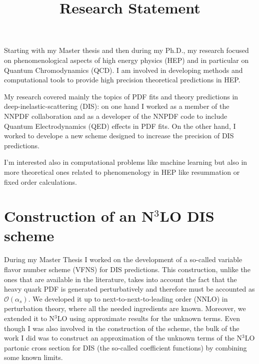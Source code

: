 \documentclass[11pt,a4paper]{moderncv}        %
\title{Research Statement}
\begin{document}
\makecvtitle

Starting with my Master thesis and then during my Ph.D., my research focused on phenomenological aspects of high energy physics (HEP)
and in particular on Quantum Chromodynamics (QCD).
I am involved in developing methods and computational tools to provide high precision theoretical predictions in HEP.


My research covered mainly the topics of PDF fits and theory predictions in deep-inelastic-scattering (DIS):
on one hand I worked as a member of the NNPDF collaboration and as a developer of the NNPDF code to include
Quantum Electrodynamics (QED) effects in PDF fits.
On the other hand, I worked to develope a new scheme designed to increase the precision of DIS predictions.

I'm interested also in computational problems like machine learning but also in more theoretical ones related to phenomenology in 
HEP like resummation or fixed order calculations.

\section{Construction of an N$^3$LO DIS scheme}

During my Master Thesis I worked on the development of a so-called variable flavor number scheme (VFNS) 
for DIS predictions.
%
%
This construction, unlike the ones that are available in the literature, takes into account the fact that the heavy quark PDF is generated
perturbatively and therefore must be accounted as $\mathcal{O}(\alpha_s)$.
%
We developed it up to next-to-next-to-leading order (NNLO) in perturbation theory, where all the needed ingredients are known.
Moreover, we extended it to N$^3$LO using approximate results for the unknown terms.
Even though I was also involved in the construction of the scheme, the bulk of the work I did was to
construct an approximation of the unknown terms of the N$^3$LO partonic cross section for DIS (the so-called coefficient functions) by
combining some known limits.
\end{document}
